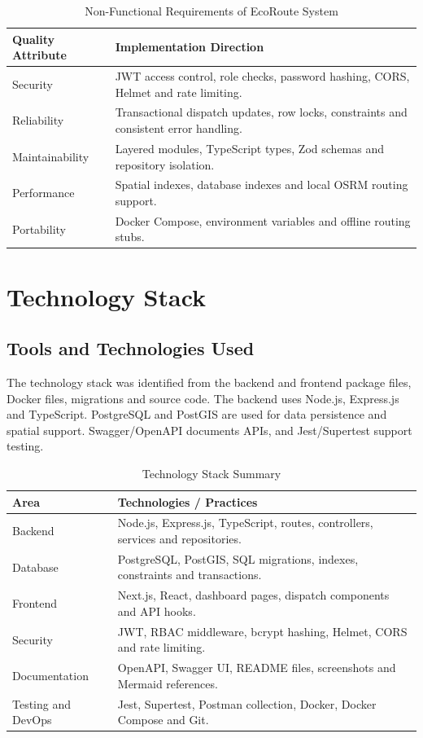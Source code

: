\documentclass[12pt,a4paper]{report}
\newcommand{\chapterheader}{CHAPTER HEADING}
\begin{document}
\begin{table}[h!]
\centering
\caption{Non-Functional Requirements of EcoRoute System}
\begin{tabular}{|p{1.8in}|p{3.6in}|}
\hline
\textbf{Quality Attribute} & \textbf{Implementation Direction}\\ \hline
Security & JWT access control, role checks, password hashing, CORS, Helmet and rate limiting.\\ \hline
Reliability & Transactional dispatch updates, row locks, constraints and consistent error handling.\\ \hline
Maintainability & Layered modules, TypeScript types, Zod schemas and repository isolation.\\ \hline
Performance & Spatial indexes, database indexes and local OSRM routing support.\\ \hline
Portability & Docker Compose, environment variables and offline routing stubs.\\ \hline
\end{tabular}
\end{table}
\clearpage

\renewcommand{\chapterheader}{CHAPTER 4}
\chapter{Technology Stack}
\section{Tools and Technologies Used}
The technology stack was identified from the backend and frontend package files, Docker files, migrations and source code. The backend uses Node.js, Express.js and TypeScript. PostgreSQL and PostGIS are used for data persistence and spatial support. Swagger/OpenAPI documents APIs, and Jest/Supertest support testing.

\begin{table}[h!]
\centering
\caption{Technology Stack Summary}
\begin{tabular}{|p{1.5in}|p{3.9in}|}
\hline
\textbf{Area} & \textbf{Technologies / Practices}\\ \hline
Backend & Node.js, Express.js, TypeScript, routes, controllers, services and repositories.\\ \hline
Database & PostgreSQL, PostGIS, SQL migrations, indexes, constraints and transactions.\\ \hline
Frontend & Next.js, React, dashboard pages, dispatch components and API hooks.\\ \hline
Security & JWT, RBAC middleware, bcrypt hashing, Helmet, CORS and rate limiting.\\ \hline
Documentation & OpenAPI, Swagger UI, README files, screenshots and Mermaid references.\\ \hline
Testing and DevOps & Jest, Supertest, Postman collection, Docker, Docker Compose and Git.\\ \hline
\end{tabular}
\end{table}
\end{document}
